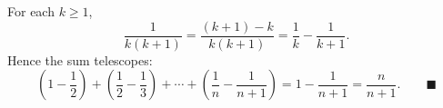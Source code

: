 For each $k\ge1$,
\[\dfrac{1}{k(k+1)}=\dfrac{(k+1)-k}{k(k+1)}=\dfrac{1}{k}-\dfrac{1}{k+1}.\]
Hence the sum telescopes:
\[\left(1-\dfrac{1}{2}\right)+\left(\dfrac{1}{2}-\dfrac{1}{3}\right)+\cdots+\left(\dfrac{1}{n}-\dfrac{1}{n+1}\right)=1-\dfrac{1}{n+1}=\dfrac{n}{n+1}.\qquad\blacksquare\]
